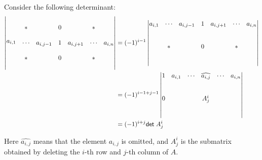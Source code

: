 \documentclass[
	11pt, %
	fleqn, %
	a4paper, %
]{LegrandOrangeBook}
\renewcommand{\det}{\mathsf{det\;}} %
\newcommand{\mypoint}[2]{\tikz[remember picture]{\node[inner sep=0, anchor=base](#1){$#2$};}}
\begin{document}
Consider the following determinant:
\vspace{6ex}
\[
    \begin{split}
        \begin{vmatrix}
            & & & \mypoint{jcol}{\phantom{*}} \\
            & * & & 0 & & * & \\ 
            \\
            \mypoint{irow}{a_{i,1}} & \cdots & a_{i,j-1} & 1 & a_{i,j+1} & \cdots & a_{i,n} \\
            \\
            & * & & 0 & & * & \\
            \\
        \end{vmatrix} & = (-1)^{i - 1} \begin{vmatrix}
            a_{i,1} & \cdots & a_{i,j-1} & 1 & a_{i,j+1} & \cdots & a_{i,n} \\
            \\ \\
            & * & & 0 & & * & \\
            \\ \\
        \end{vmatrix} \\
        & = (-1)^{i - 1 + j - 1} \begin{vmatrix}
            1 & a_{i,1} & \cdots & \widehat{a_{i,j}} & \cdots & a_{i,n} \\
            \\ \\
            0 & & & A^i_j \\
            \\ \\
        \end{vmatrix} \\
        & = (-1)^{i + j} \det A^i_j
    \end{split}
\]
Here $\widehat{a_{i,j}}$ means that the element $a_{i,j}$ is omitted, and $A^i_j$ is the submatrix obtained by deleting the $i$-th row and $j$-th column of $A$.
\end{document}
